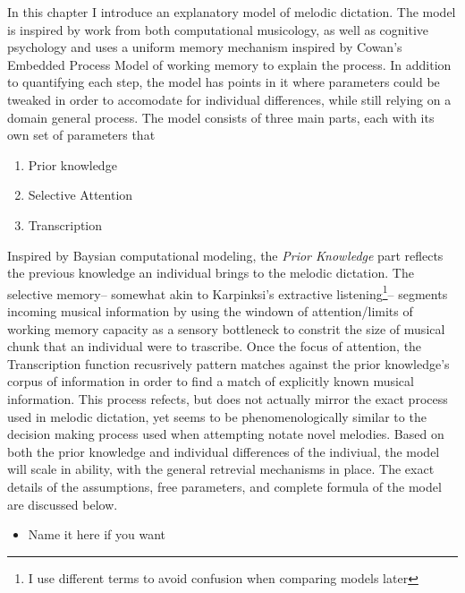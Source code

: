 \documentclass[]{book}
\providecommand{\tightlist}{%
  \setlength{\itemsep}{0pt}\setlength{\parskip}{0pt}}
\let\rmarkdownfootnote\footnote%
\def\footnote{\protect\rmarkdownfootnote}
\theoremstyle{definition}
\theoremstyle{definition}
\theoremstyle{definition}
\theoremstyle{remark}
\begin{document}
In this chapter I introduce an explanatory model of melodic dictation.
The model is inspired by work from both computational musicology, as
well as cognitive psychology and uses a uniform memory mechanism
inspired by Cowan's Embedded Process Model of working memory to explain
the process. In addition to quantifying each step, the model has points
in it where parameters could be tweaked in order to accomodate for
individual differences, while still relying on a domain general process.
The model consists of three main parts, each with its own set of
parameters that

\begin{enumerate}
\def\labelenumi{\arabic{enumi}.}
\tightlist
\item
  Prior knowledge
\item
  Selective Attention
\item
  Transcription
\end{enumerate}

Inspired by Baysian computational modeling, the \emph{Prior Knowledge}
part reflects the previous knowledge an individual brings to the melodic
dictation. The selective memory-- somewhat akin to Karpinksi's
extractive listening\footnote{I use different terms to avoid confusion
  when comparing models later}-- segments incoming musical information
by using the windown of attention/limits of working memory capacity as a
sensory bottleneck to constrit the size of musical chunk that an
individual were to trascribe. Once the focus of attention, the
Transcription function recusrively pattern matches against the prior
knowledge's corpus of information in order to find a match of explicitly
known musical information. This process refects, but does not actually
mirror the exact process used in melodic dictation, yet seems to be
phenomenologically similar to the decision making process used when
attempting notate novel melodies. Based on both the prior knowledge and
individual differences of the indiviual, the model will scale in
ability, with the general retrevial mechanisms in place. The exact
details of the assumptions, free parameters, and complete formula of the
model are discussed below.

\begin{itemize}
\tightlist
\item
  Name it here if you want
\end{itemize}
\end{document}

